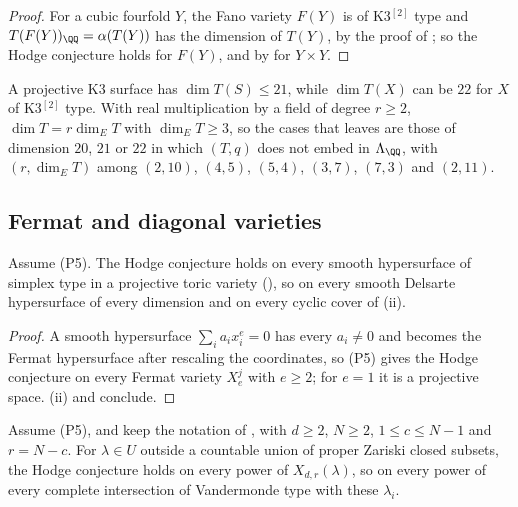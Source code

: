 \begin{proof}
For a cubic fourfold $Y$, the Fano variety $F(Y)$ is of K3$^{[2]}$ type and
$T(F(Y))_{\QQ}=\alpha(T(Y))$ has the dimension of $T(Y)$, by the proof of
; so the Hodge conjecture holds for $F(Y)$, and by
 for $Y\times Y$.
\end{proof}

A projective K3 surface has $\dim T(S)\le21$, while $\dim T(X)$ can be $22$
for $X$ of K3$^{[2]}$ type. With real multiplication by a field of degree
$r\ge2$, $\dim T=r\dim_{E}T$ with $\dim_{E}T\ge3$, so the cases that
 leaves are those of dimension $20$, $21$ or $22$ in
which $(T,q)$ does not embed in $\Lambda_{\QQ}$, with
$(r,\dim_{E}T)$ among $(2,10)$, $(4,5)$, $(5,4)$, $(3,7)$, $(7,3)$ and
$(2,11)$.

\subsection{Fermat and diagonal varieties}\label{ssec:fermatall}

\begin{corollary}\label{cor:simplexhc}
Assume \textup{(P5)}. The Hodge conjecture holds on every smooth hypersurface
of simplex type in a projective toric variety (), so on
every smooth Delsarte hypersurface of every dimension and on every cyclic
cover of (ii).
\end{corollary}

\begin{proof}
A smooth hypersurface $\sum_{i}a_{i}x_{i}^{e}=0$ has every $a_{i}\ne0$ and
becomes the Fermat hypersurface after rescaling the coordinates, so (P5)
gives the Hodge conjecture on every Fermat variety $X^{j}_{e}$ with $e\ge2$;
for $e=1$ it is a projective space. (ii) and
 conclude.
\end{proof}

\begin{corollary}
\label{cor:vgalldegrees}
Assume \textup{(P5)}, and keep the notation of , with
$d\ge2$, $N\ge2$, $1\le c\le N-1$ and $r=N-c$. For $\lambda\in U$ outside a
countable union of proper Zariski closed subsets, the Hodge conjecture holds
on every power of $X_{d,r}(\lambda)$, so on every power of every complete
intersection of Vandermonde type with these $\lambda_{i}$.
\end{corollary}

